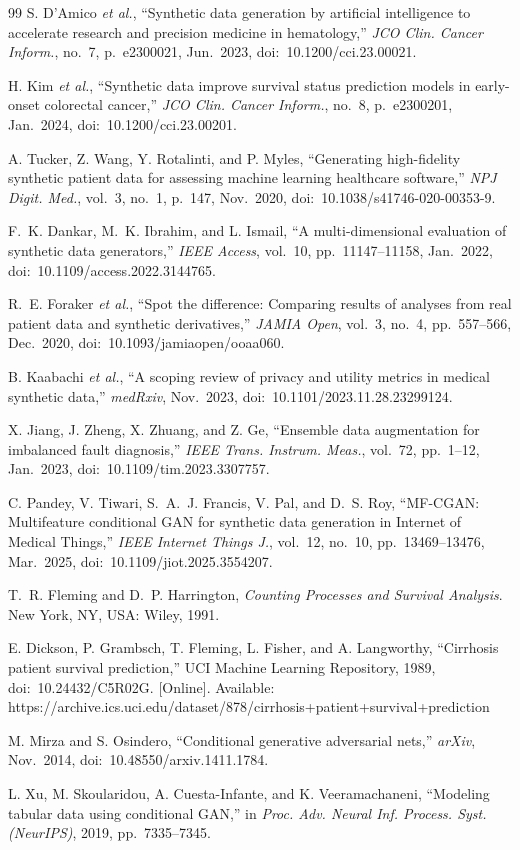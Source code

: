 \documentclass[journal]{IEEEtran}
\begin{document}
\begin{thebibliography}{99}
S. D'Amico \textit{et al.}, ``Synthetic data generation by artificial intelligence to accelerate research and precision medicine in hematology,'' \textit{JCO Clin. Cancer Inform.}, no.~7, p.~e2300021, Jun.~2023, doi:~10.1200/cci.23.00021.

H. Kim \textit{et al.}, ``Synthetic data improve survival status prediction models in early-onset colorectal cancer,'' \textit{JCO Clin. Cancer Inform.}, no.~8, p.~e2300201, Jan.~2024, doi:~10.1200/cci.23.00201.

A. Tucker, Z. Wang, Y. Rotalinti, and P. Myles, ``Generating high-fidelity synthetic patient data for assessing machine learning healthcare software,'' \textit{NPJ Digit. Med.}, vol.~3, no.~1, p.~147, Nov.~2020, doi:~10.1038/s41746-020-00353-9.

F.~K. Dankar, M.~K. Ibrahim, and L. Ismail, ``A multi-dimensional evaluation of synthetic data generators,'' \textit{IEEE Access}, vol.~10, pp.~11147--11158, Jan.~2022, doi:~10.1109/access.2022.3144765.

R.~E. Foraker \textit{et al.}, ``Spot the difference: Comparing results of analyses from real patient data and synthetic derivatives,'' \textit{JAMIA Open}, vol.~3, no.~4, pp.~557--566, Dec.~2020, doi:~10.1093/jamiaopen/ooaa060.

B. Kaabachi \textit{et al.}, ``A scoping review of privacy and utility metrics in medical synthetic data,'' \textit{medRxiv}, Nov.~2023, doi:~10.1101/2023.11.28.23299124.

X. Jiang, J. Zheng, X. Zhuang, and Z. Ge, ``Ensemble data augmentation for imbalanced fault diagnosis,'' \textit{IEEE Trans. Instrum. Meas.}, vol.~72, pp.~1--12, Jan.~2023, doi:~10.1109/tim.2023.3307757.

C. Pandey, V. Tiwari, S.~A.~J. Francis, V. Pal, and D.~S. Roy, ``MF-CGAN: Multifeature conditional GAN for synthetic data generation in Internet of Medical Things,'' \textit{IEEE Internet Things J.}, vol.~12, no.~10, pp.~13469--13476, Mar.~2025, doi:~10.1109/jiot.2025.3554207.

T.~R. Fleming and D.~P. Harrington, \textit{Counting Processes and Survival Analysis}. New York, NY, USA: Wiley, 1991.

E. Dickson, P. Grambsch, T. Fleming, L. Fisher, and A. Langworthy, ``Cirrhosis patient survival prediction,'' UCI Machine Learning Repository, 1989, doi:~10.24432/C5R02G. [Online]. Available: https://archive.ics.uci.edu/dataset/878/cirrhosis+patient+survival+prediction

M. Mirza and S. Osindero, ``Conditional generative adversarial nets,'' \textit{arXiv}, Nov.~2014, doi:~10.48550/arxiv.1411.1784.

L. Xu, M. Skoularidou, A. Cuesta-Infante, and K. Veeramachaneni, ``Modeling tabular data using conditional GAN,'' in \textit{Proc. Adv. Neural Inf. Process. Syst. (NeurIPS)}, 2019, pp.~7335--7345.

\end{thebibliography}
\end{document}

